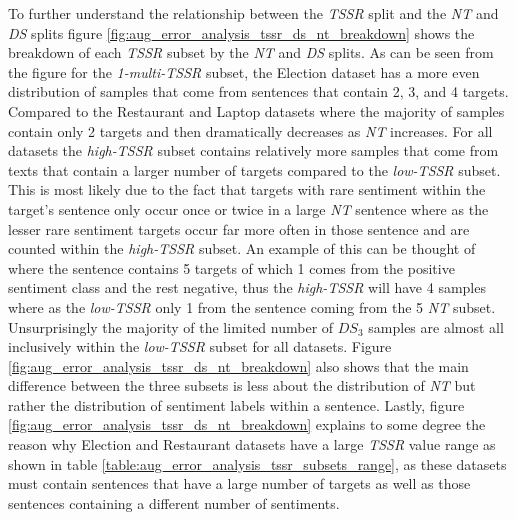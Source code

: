 To further understand the relationship between the \textit{TSSR} split and the \textit{NT} and \textit{DS} splits figure \ref{fig:aug_error_analysis_tssr_ds_nt_breakdown} shows the breakdown of each \textit{TSSR} subset by the \textit{NT} and \textit{DS} splits. As can be seen from the figure for the \textit{1-multi-TSSR} subset, the Election dataset has a more even distribution of samples that come from sentences that contain 2, 3, and 4 targets. Compared to the Restaurant and Laptop datasets where the majority of samples contain only 2 targets and then dramatically decreases as \textit{NT} increases. For all datasets the \textit{high-TSSR} subset contains relatively more samples that come from texts that contain a larger number of targets compared to the \textit{low-TSSR} subset. This is most likely due to the fact that targets with rare sentiment within the target's sentence only occur once or twice in a large \textit{NT} sentence where as the lesser rare sentiment targets occur far more often in those sentence and are counted within the \textit{high-TSSR} subset. An example of this can be thought of where the sentence contains 5 targets of which 1 comes from the positive sentiment class and the rest negative, thus the \textit{high-TSSR} will have 4 samples where as the \textit{low-TSSR} only 1 from the sentence coming from the 5 \textit{NT} subset. Unsurprisingly the majority of the limited number of $DS_3$ samples are almost all inclusively within the \textit{low-TSSR} subset for all datasets. Figure \ref{fig:aug_error_analysis_tssr_ds_nt_breakdown} also shows that the main difference between the three subsets is less about the distribution of \textit{NT} but rather the distribution of sentiment labels within a sentence. Lastly, figure \ref{fig:aug_error_analysis_tssr_ds_nt_breakdown} explains to some degree the reason why Election and Restaurant datasets have a large \textit{TSSR} value range as shown in table \ref{table:aug_error_analysis_tssr_subsets_range}, as these datasets must contain sentences that have a large number of targets as well as those sentences containing a different number of sentiments. 

